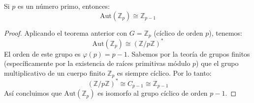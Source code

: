 \begin{cor}
    Si $p$ es un número primo, entonces:
    \begin{equation*}
        \text{Aut}(\mathbb{Z}_p) \cong \mathbb{Z}_{p-1}
    \end{equation*}
\end{cor}

\begin{proof}
    Aplicando el teorema anterior con $G = \mathbb{Z}_p$ (cíclico de orden $p$), tenemos:
    \begin{equation*}
        \text{Aut}(\mathbb{Z}_p) \cong (\mathbb{Z}/p\mathbb{Z})^*
    \end{equation*}
    El orden de este grupo es $\varphi(p) = p-1$.
    Sabemos por la teoría de grupos finitos (específicamente por la existencia de raíces primitivas módulo $p$) que el grupo multiplicativo de un cuerpo finito $\mathbb{Z}_p$ es siempre cíclico.
    Por lo tanto:
    \begin{equation*}
        (\mathbb{Z}/p\mathbb{Z})^* \cong C_{p-1} \cong \mathbb{Z}_{p-1}
    \end{equation*}
    Así concluimos que $\text{Aut}(\mathbb{Z}_p)$ es isomorfo al grupo cíclico de orden $p-1$.
\end{proof}
